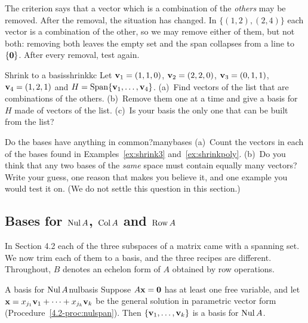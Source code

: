 \documentclass[11pt]{article}
\begin{document}
\begin{warn}
The criterion says that a vector which is a combination of the \emph{others} may be removed. After the removal, the situation has changed. In $\{(1,2),(2,4)\}$ each vector is a combination of the other, so we may remove either of them, but not both: removing both leaves the empty set and the span collapses from a line to $\{\mathbf{0}\}$. After every removal, test again.
\end{warn}

\begin{kc}{Shrink to a basis}{shrinkkc}
Let $\mathbf{v}_1=(1,1,0)$, $\mathbf{v}_2=(2,2,0)$, $\mathbf{v}_3=(0,1,1)$, $\mathbf{v}_4=(1,2,1)$ and $H=\operatorname{Span}\{\mathbf{v}_1,\dots,\mathbf{v}_4\}$. (a)~Find vectors of the list that are combinations of the others. (b)~Remove them one at a time and give a basis for $H$ made of vectors of the list. (c)~Is your basis the only one that can be built from the list?
\end{kc}

\begin{think}{Do the bases have anything in common?}{manybases}
(a)~Count the vectors in each of the bases found in Examples~\ref{ex:shrink3} and~\ref{ex:shrinkpoly}. (b)~Do you think that any two bases of the \emph{same} space must contain equally many vectors? Write your guess, one reason that makes you believe it, and one example you would test it on. (We do not settle this question in this section.)
\end{think}

\subsection*{Bases for $\operatorname{Nul} A$, $\operatorname{Col} A$ and $\operatorname{Row} A$}

In Section 4.2 each of the three subspaces of a matrix came with a spanning set. We now trim each of them to a basis, and the three recipes are different. Throughout, $B$ denotes an echelon form of $A$ obtained by row operations.

\begin{thm}{A basis for $\operatorname{Nul} A$}{nulbasis}
Suppose $A\mathbf{x}=\mathbf{0}$ has at least one free variable, and let $\mathbf{x}=x_{j_1}\mathbf{v}_1+\cdots+x_{j_k}\mathbf{v}_k$ be the general solution in parametric vector form (Procedure~\ref{4.2-proc:nulspan}). Then $\{\mathbf{v}_1,\dots,\mathbf{v}_k\}$ is a basis for $\operatorname{Nul} A$.
\end{thm}
\end{document}
